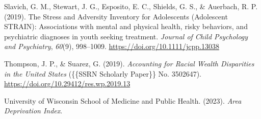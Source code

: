 \documentclass[
  man]{apa7}
\newlength{\cslhangindent}
\newlength{\cslentryspacingunit} %
\newenvironment{CSLReferences}[2] %
 {%
  \setlength{\parindent}{0pt}
  \ifodd #1
  \let\oldpar\par
  \def\par{\hangindent=\cslhangindent\oldpar}
  \fi
  \setlength{\parskip}{#2\cslentryspacingunit}
 }%
 {}
\begin{document}
\begin{CSLReferences}{1}{0}
\leavevmode{}%
Slavich, G. M., Stewart, J. G., Esposito, E. C., Shields, G. S., \& Auerbach, R. P. (2019). The {Stress} and {Adversity Inventory} for {Adolescents} ({Adolescent STRAIN}): Associations with mental and physical health, risky behaviors, and psychiatric diagnoses in youth seeking treatment. \emph{Journal of Child Psychology and Psychiatry}, \emph{60}(9), 998--1009. \url{https://doi.org/10.1111/jcpp.13038}

\leavevmode{}%
Thompson, J. P., \& Suarez, G. (2019). \emph{Accounting for {Racial Wealth Disparities} in the {United States}} (\{\{SSRN Scholarly Paper\}\} No. 3502647). \url{https://doi.org/10.29412/res.wp.2019.13}

\leavevmode{}%
University of Wisconsin School of Medicine and Public Health. (2023). \emph{Area {Deprivation Index}}.

\end{CSLReferences}
\end{document}
